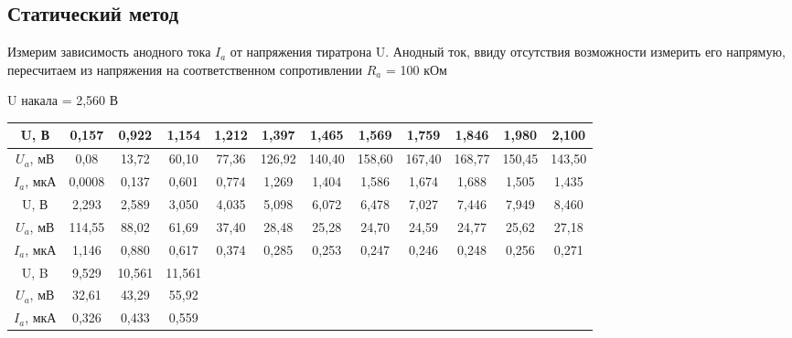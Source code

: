\documentclass[12pt,a4paper]{article}
\begin{document}
\subsection{Статический метод}

Измерим зависимость анодного тока $I_a$ от напряжения тиратрона U. Анодный ток, ввиду отсутствия возможности измерить его напрямую, пересчитаем из напряжения на соответственном сопротивлении $R_a$ = 100 кОм

\begin{center}
U накала = 2,560 В
\begin{tabular}{|c|c|c|c|c|c|c|c|c|c|c|c|}
\hline 
U, В & 0,157 & 0,922 & 1,154 & 1,212 & 1,397 & 1,465 & 1,569 & 1,759 & 1,846 & 1,980 & 2,100 \\
\hline 
$U_a$, мВ & 0,08 & 13,72 & 60,10 & 77,36 & 126,92 & 140,40 & 158,60 & 167,40 & 168,77 & 150,45 & 143,50  \\ 
\hline 
$I_a$, мкА & 0,0008 & 0,137 & 0,601 & 0,774 & 1,269 & 1,404 & 1,586 & 1,674 & 1,688 & 1,505 & 1,435 \\ 
\hline 
U, В& 2,293 & 2,589 & 3,050 & 4,035 & 5,098 & 6,072 & 6,478 & 7,027 & 7,446 & 7,949 & 8,460  \\ 
\hline
$U_a$, мВ & 114,55 & 88,02 & 61,69 & 37,40 & 28,48 & 25,28 & 24,70 & 24,59 & 24,77 & 25,62 & 27,18  \\
\hline
$I_a$, мкА & 1,146 & 0,880 & 0,617 & 0,374 & 0,285 & 0,253 & 0,247 & 0,246 & 0,248 & 0,256 & 0,271  \\
\hline
U, B & 9,529 & 10,561 & 11,561 & & & & & & & &\\
\hline
$U_a$, мВ & 32,61 & 43,29 & 55,92 & & & & & & & & \\
\hline
$I_a$, мкА & 0,326 & 0,433 & 0,559 & & & & & & & & \\
\hline
\end{tabular} 
\end{center}
\end{document}
